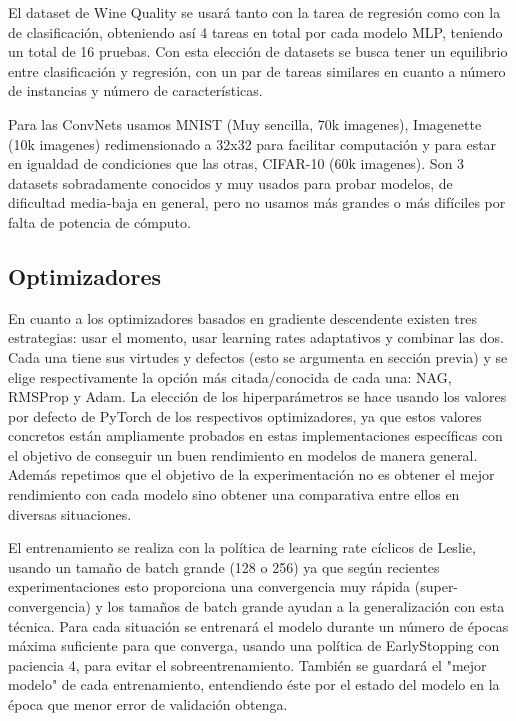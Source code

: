 El dataset de Wine Quality se usará tanto con la tarea de regresión como con la de clasificación, obteniendo así 4 tareas en total por cada modelo MLP, teniendo un total de 16 pruebas. Con esta elección de datasets se busca tener un equilibrio entre clasificación y regresión, con un par de tareas similares en cuanto a número de instancias y número de características.

Para las ConvNets usamos MNIST (Muy sencilla, 70k imagenes), Imagenette (10k imagenes) redimensionado a 32x32 para facilitar computación y para estar en igualdad de condiciones que las otras,  CIFAR-10 (60k imagenes). Son 3 datasets sobradamente conocidos y muy usados para probar modelos, de dificultad media-baja en general, pero no usamos más grandes o más difíciles por falta de potencia de cómputo.

\subsection{Optimizadores}

En cuanto a los optimizadores basados en gradiente descendente existen tres estrategias: usar el momento, usar learning rates adaptativos y combinar las dos. Cada una tiene sus virtudes y defectos (esto se argumenta en sección previa) y se elige respectivamente la opción más citada/conocida de cada una:  NAG, RMSProp y Adam. La elección de los hiperparámetros se hace usando los valores por defecto de PyTorch de los respectivos optimizadores, ya que estos valores concretos están ampliamente probados en estas implementaciones específicas con el objetivo de conseguir un buen rendimiento en modelos de manera general. Además repetimos que el objetivo de la experimentación no es obtener el mejor rendimiento con cada modelo sino obtener una comparativa entre ellos en diversas situaciones. 

El entrenamiento se realiza con la política de learning rate cíclicos de Leslie, usando un tamaño de batch grande (128 o 256) ya que según recientes experimentaciones esto proporciona una convergencia muy rápida (super-convergencia) y los tamaños de batch grande ayudan a la generalización con esta técnica. Para cada situación se entrenará el modelo durante un número de épocas máxima suficiente para que converga, usando una política de EarlyStopping con paciencia 4, para evitar el sobreentrenamiento. También se guardará el "mejor modelo" de cada entrenamiento, entendiendo éste por el estado del modelo en la época que menor error de validación obtenga. 

